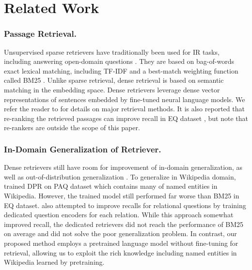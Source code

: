 \documentclass[letterpaper]{article} %
\begin{document}
\section{Related Work}\label{sec:related}
\subsubsection{Passage Retrieval.}
Unsupervised sparse retrievers have traditionally been used for IR tasks, including answering open-domain questions \citep{chen-etal-2017-reading}.
They are based on bag-of-words exact lexical matching, including TF-IDF and a best-match weighting function called BM25 \citep{robertson1995okapi, robertson2009probabilistic}.
Unlike sparse retrieval, dense retrieval is based on semantic matching in the embedding space.
Dense retrievers leverage dense vector representations of sentences embedded by fine-tuned neural language models.
We refer the reader to \citet{thakur2021beir} for details on major retrieval methods.
It is also reported that re-ranking the retrieved passages can improve recall in EQ dataset \citep[e.g.,][]{sachan2022improving}, but note that re-rankers are outside the scope of this paper.

\subsubsection{In-Domain Generalization of Retriever.}
Dense retrievers still have room for improvement of in-domain generalization, as well as out-of-distribution generalization \citep{thakur2021beir}.
To generalize in Wikipedia domain, \citet{sciavolino-etal-2021-simple} trained DPR on PAQ dataset \citep{lewis-etal-2021-paq} which contains many of named entities in Wikipedia.
However, the trained model still performed far worse than BM25 in EQ dataset.
\citet{sciavolino-etal-2021-simple} also attempted to improve recalls for relational questions by training dedicated question encoders for each relation.
While this approach somewhat improved recall, the dedicated retrievers did not reach the performance of BM25 on average and did not solve the poor generalization problem.
In contrast, our proposed method employs a pretrained language model without fine-tuning for retrieval, allowing us to exploit the rich knowledge including named entities in Wikipedia learned by pretraining.
\end{document}
